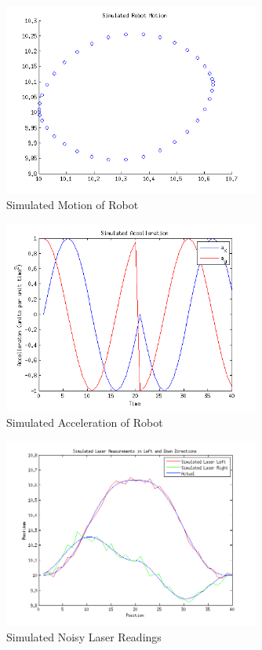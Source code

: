 \documentclass[english]{article}
\begin{document}
\begin{figure}[htp]
\centering
 \includegraphics[width=0.75\textwidth]{images/simulatedmotion.png}
\caption{Simulated Motion of Robot}
\label{fig:simmo}
\end{figure}

\begin{figure}[htp]
\centering
 \includegraphics[width=0.75\textwidth]{images/simulatedaccelleration.png}
\caption{Simulated Acceleration of Robot}
\label{fig:simac}
\end{figure}

\begin{figure}[htp]
\centering
 \includegraphics[width=0.75\textwidth]{images/simulatedlaser.png}
\caption{Simulated Noisy Laser Readings}
\label{fig:siml}
\end{figure}
\end{document}
